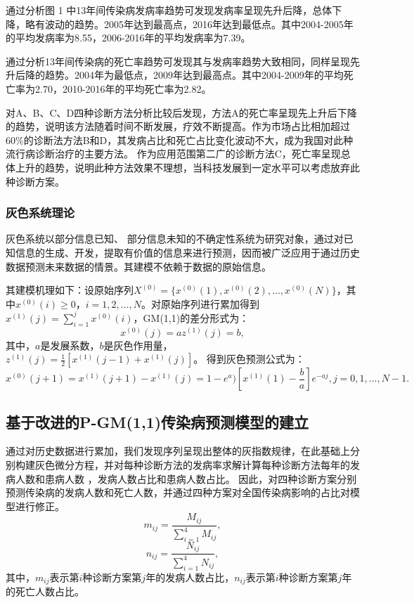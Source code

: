 \documentclass{whutmod}
\begin{document}
通过分析图 1 中13年间传染病发病率趋势可发现发病率呈现先升后降，总体下降，略有波动的趋势。2005年达到最高点，2016年达到最低点。其中2004-2005年的平均发病率为8.55\textperthousand，2006-2016年的平均发病率为7.39\textperthousand。

通过分析13年间传染病的死亡率趋势可发现其与发病率趋势大致相同，同样呈现先升后降的趋势。2004年为最低点，2009年达到最高点。其中2004-2009年的平均死亡率为2.70\textperthousand，2010-2016年的平均死亡率为2.82\textperthousand。

对A、B、C、D四种诊断方法分析比较后发现，方法A的死亡率呈现先上升后下降的趋势，说明该方法随着时间不断发展，疗效不断提高。作为市场占比相加超过60\%的诊断法方法B和D，其发病占比和死亡占比变化波动不大，成为我国对此种流行病诊断治疗的主要方法。
作为应用范围第二广的诊断方法C，死亡率呈现总体上升的趋势，说明此种方法效果不理想，当科技发展到一定水平可以考虑放弃此种诊断方案。

\subsubsection{灰色系统理论}
灰色系统以部分信息已知、 部分信息未知的不确定性系统为研究对象，通过对已知信息的生成、开发，提取有价值的信息来进行预测，因而被广泛应用于通过历史数据预测未来数据的情景。其建模不依赖于数据的原始信息。

其建模机理如下：设原始序列$X^{(0)}=\{x^{(0)}(1),x^{(0)}(2),\dots,x^{(0)}(N)\}$，其中$x^{(0)}(i)\geq 0$，$i=1,2,\dots,N$。对原始序列进行累加得到$x^{(1)}(j)=\sum_{i=1}^jx^{(0)}(i)$，GM(1,1)的差分形式为：
\begin{equation*}
    x^{(0)}(j)=az^{(1)}(j)=b,
\end{equation*}
其中，$a$是发展系数，$b$是灰色作用量，$z^{(1)}(j)=\frac12[x^{(1)}(j-1)+x^{(1)}(j)]$。
得到灰色预测公式为：
\begin{equation*}
    x^{(0)}(j+1)=x^{(1)}(j+1)-x^{(1)}(j)=1-e^a)[x^{(1)}(1)-\frac{b}{a}]e^{-aj},j=0,1,\dots,N-1.
\end{equation*}

\subsection{基于改进的P-GM(1,1)传染病预测模型的建立}
通过对历史数据进行累加，我们发现序列呈现出整体的灰指数规律，在此基础上分别构建灰色微分方程，并对每种诊断方法的发病率求解计算每种诊断方法每年的发病人数和患病人数
，发病人数占比和患病人数占比。
因此，对四种诊断方案分别预测传染病的发病人数和死亡人数，并通过四种方案对全国传染病影响的占比对模型进行修正。
\begin{equation}
    m_{ij}=\frac{M_{ij}}{\sum_{i=1}^4M_{ij}},
\end{equation}
\begin{equation}
    n_{ij}=\frac{N_{ij}}{\sum_{i=1}^4N_{ij}},
\end{equation}
其中，$m_{ij}$表示第$i$种诊断方案第$j$年的发病人数占比，$n_{ij}$表示第$i$种诊断方案第$j$年的死亡人数占比。
\end{document}

